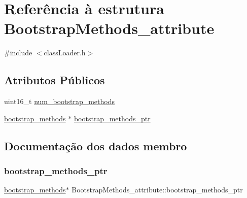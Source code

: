 \hypertarget{struct_bootstrap_methods__attribute}{}\section{Referência à estrutura Bootstrap\+Methods\+\_\+attribute}
\label{struct_bootstrap_methods__attribute}


{\ttfamily \#include $<$class\+Loader.\+h$>$}

\subsection*{Atributos Públicos}
\begin{DoxyCompactItemize}
\item 
uint16\+\_\+t \hyperlink{struct_bootstrap_methods__attribute_ad87f2078027ed3c38dd60297108ccfd9}{num\+\_\+bootstrap\+\_\+methods}
\item 
\hyperlink{structbootstrap__methods}{bootstrap\+\_\+methods} $\ast$ \hyperlink{struct_bootstrap_methods__attribute_afccff6225c86f55faeae52dcb48a6ff9}{bootstrap\+\_\+methods\+\_\+ptr}
\end{DoxyCompactItemize}


\subsection{Documentação dos dados membro}
\hypertarget{struct_bootstrap_methods__attribute_afccff6225c86f55faeae52dcb48a6ff9}{}\label{struct_bootstrap_methods__attribute_afccff6225c86f55faeae52dcb48a6ff9} 
\subsubsection{\texorpdfstring{bootstrap\+\_\+methods\+\_\+ptr}{bootstrap\_methods\_ptr}}
{\footnotesize\ttfamily \hyperlink{structbootstrap__methods}{bootstrap\+\_\+methods}$\ast$ Bootstrap\+Methods\+\_\+attribute\+::bootstrap\+\_\+methods\+\_\+ptr}

\hypertarget{struct_bootstrap_methods__attribute_ad87f2078027ed3c38dd60297108ccfd9}{}\label{struct_bootstrap_methods__attribute_ad87f2078027ed3c38dd60297108ccfd9} 
